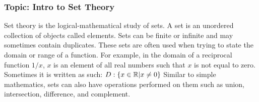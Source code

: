 \documentclass{article}
\begin{document}
\subsubsection{Topic: Intro to Set Theory}

Set theory is the logical-mathematical study of sets. A set is an unordered collection of objects called elements. Sets can be finite or infinite and may sometimes contain duplicates. These sets are often used when trying to state the domain or range of a function. For example, in the domain of a reciprocal function $1/x$, $x$ is an element of all real numbers such that $x$ is not equal to zero. Sometimes it is written as such:
$D: \{ x \in \mathbb{R} | x \not = 0 \} \\$
Similar to simple mathematics, sets can also have operations performed on them such as union, intersection, difference, and complement.
\end{document}
